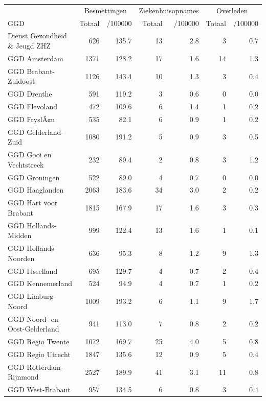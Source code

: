 \documentclass[
  english,
  man,floatsintext]{apa6}
\begin{document}
\begin{table}
\centering\begingroup\fontsize{10}{12}\selectfont

\begin{threeparttable}
\begin{tabular}{lrrrrrr}
\toprule
\multicolumn{1}{c}{ } & \multicolumn{2}{c}{Besmettingen} & \multicolumn{2}{c}{Ziekenhuisopnames} & \multicolumn{2}{c}{Overleden} \\
\cmidrule(l{3pt}r{3pt}){2-3} \cmidrule(l{3pt}r{3pt}){4-5} \cmidrule(l{3pt}r{3pt}){6-7}
GGD & Totaal & /100000 & Totaal & /100000 & Totaal & /100000\\
\midrule
Dienst Gezondheid \& Jeugd ZHZ & 626 & 135.7 & 13 & 2.8 & 3 & 0.7\\
GGD Amsterdam & 1371 & 128.2 & 17 & 1.6 & 14 & 1.3\\
GGD Brabant-Zuidoost & 1126 & 143.4 & 10 & 1.3 & 3 & 0.4\\
GGD Drenthe & 591 & 119.2 & 3 & 0.6 & 0 & 0.0\\
GGD Flevoland & 472 & 109.6 & 6 & 1.4 & 1 & 0.2\\
GGD FryslÃ¢n & 535 & 82.1 & 6 & 0.9 & 1 & 0.2\\
GGD Gelderland-Zuid & 1080 & 191.2 & 5 & 0.9 & 3 & 0.5\\
GGD Gooi en Vechtstreek & 232 & 89.4 & 2 & 0.8 & 3 & 1.2\\
GGD Groningen & 522 & 89.0 & 4 & 0.7 & 0 & 0.0\\
GGD Haaglanden & 2063 & 183.6 & 34 & 3.0 & 2 & 0.2\\
GGD Hart voor Brabant & 1815 & 167.9 & 17 & 1.6 & 3 & 0.3\\
GGD Hollands-Midden & 999 & 122.4 & 13 & 1.6 & 1 & 0.1\\
GGD Hollands-Noorden & 636 & 95.3 & 8 & 1.2 & 9 & 1.3\\
GGD IJsselland & 695 & 129.7 & 4 & 0.7 & 2 & 0.4\\
GGD Kennemerland & 524 & 94.9 & 4 & 0.7 & 1 & 0.2\\
GGD Limburg-Noord & 1009 & 193.2 & 6 & 1.1 & 9 & 1.7\\
GGD Noord- en Oost-Gelderland & 941 & 113.0 & 7 & 0.8 & 2 & 0.2\\
GGD Regio Twente & 1072 & 169.7 & 25 & 4.0 & 5 & 0.8\\
GGD Regio Utrecht & 1847 & 135.6 & 12 & 0.9 & 5 & 0.4\\
GGD Rotterdam-Rijnmond & 2527 & 189.9 & 41 & 3.1 & 11 & 0.8\\
GGD West-Brabant & 957 & 134.5 & 6 & 0.8 & 3 & 0.4\\

\end{tabular}
\end{threeparttable}
\end{table}
\end{document}
